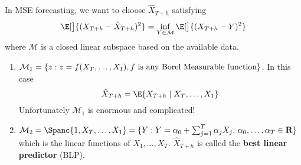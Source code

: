 In MSE forecasting, we want to choose
$ \hat{X}_{T+h} $ satisfying
\[ \E[\big]{(X_{T+h}-\hat{X}_{T+h})^2}=\inf_{Y\in \mathcal{M}}\E[\big]{(X_{T+h}-Y)^2} \]
where $ \mathcal{M} $ is a closed linear subspace based on the available
data.
\begin{enumerate}[(1)]
    \item $ \mathcal{M}_1=\{z:z=f(X_{T},\ldots,X_{1}), f\text{ is any
                  Borel Measurable function}\} $.
          In this case
          \[ \hat{X}_{T+h}=\E{X_{T+h}\mid X_{T},\ldots,X_1} \]
          Unfortunately $ \mathcal{M}_1 $ is enormous and complicated!
    \item $ \mathcal{M}_2=\Spanc{1,X_{T},\ldots,X_1}=
              \set{Y:Y=\alpha_0+\sum_{j=1}^{T} \alpha_j X_j,\,\alpha_0,\ldots,\alpha_T\in\mathbf{R}} $
          which is the linear functions of $ X_1,\ldots,X_T $.
          $ \hat{X}_{T+h} $ is called the \textbf{best linear predictor} (BLP).
\end{enumerate}
